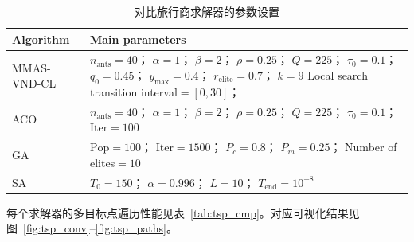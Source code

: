 \documentclass[lettersize,journal]{IEEEtran}
\begin{document}
\begin{table}[htbp]
\caption{对比旅行商求解器的参数设置}
\label{tab:tsp_params}
\centering
\scriptsize
\begin{tabular}{>{\centering\arraybackslash}m{} m{}}
\toprule
Algorithm & Main parameters \\
\midrule
MMAS-VND-CL & $n_{\mathrm{ants}}=40$；
$\alpha=1$；
$\beta=2$；\newline
$\rho=0.25$；
$Q=225$；
$\tau_0=0.1$；\newline
$q_0=0.45$；
$y_{\max}=0.4$；\newline
$r_{\mathrm{elite}}=0.7$；
$k=9$ \newline
Local search transition interval$=[0,30]$；\\
\midrule
ACO & $n_{\mathrm{ants}}=40$；
$\alpha=1$；
$\beta=2$；
$\rho=0.25$；\newline
$Q=225$；
$\tau_0=0.1$；
$\mathrm{Iter}=100$ \\
\midrule
GA & $\mathrm{Pop}=100$；
$\mathrm{Iter}=1500$；\newline
$P_c=0.8$；
$P_m=0.25$；\newline
Number of elites$=10$ \\
\midrule
SA & $T_0=150$；
$\alpha=0.996$；\newline
$L=10$；
$T_{\mathrm{end}}=10^{-8}$ \\
\bottomrule
\end{tabular}
\end{table}

每个求解器的多目标点遍历性能见表~\textcolor{blue}{\ref{tab:tsp_cmp}}。对应可视化结果见图~\textcolor{blue}{\ref{fig:tsp_conv}}--\textcolor{blue}{\ref{fig:tsp_paths}}。
\end{document}
